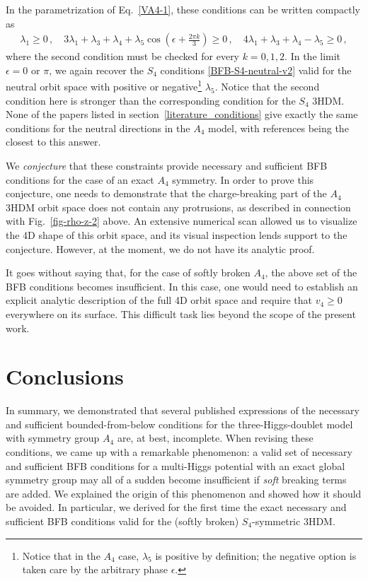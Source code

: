 \documentclass[11pt]{article}
\begin{document}
In the parametrization of Eq.~\eqref{VA4-1}, these conditions can be written compactly as 
\begin{eqnarray}
\lambda_1 \ge 0\,, \quad 
3\lambda_1 + \lambda_3 + \lambda_4 + \lambda_5 \cos\left(\epsilon + \frac{2\pi k}{3}\right) \ge 0\,,\quad 
4\lambda_1 + \lambda_3 + \lambda_4 - \lambda_5 \ge 0\,,
\label{BFB-A4-neural-v2}
\end{eqnarray}
where the second condition must be checked for every $k = 0,1,2$.
In the limit $\epsilon = 0$ or $\pi$, we again recover the $S_4$ conditions \eqref{BFB-S4-neutral-v2}
valid for the neutral orbit space with positive or negative\footnote{Notice that in the $A_4$ case,
$\lambda_5$ is positive by definition; the negative option is taken care by the arbitrary phase $\epsilon$.} $\lambda_5$. 
Notice that the second condition here is stronger than the corresponding condition for the $S_4$ 3HDM.
None of the papers listed in section~\ref{literature_conditions} give exactly the same conditions for the neutral
directions in the $A_4$ model, with references \cite{Dekens:2011,Pramanick:2017wry} being the closest to this answer.

We {\em conjecture} that these constraints provide necessary and sufficient BFB conditions for the case of an exact $A_4$ symmetry.
In order to prove this conjecture, one needs to demonstrate that the charge-breaking part of the $A_4$ 3HDM orbit space
does not contain any protrusions, as described in connection with Fig.~\ref{fig-rho-z-2} above. 
An extensive numerical scan allowed us to visualize the 4D shape of this orbit space,
and its visual inspection lends support to the conjecture. However, at the moment, we do not have its analytic proof.

It goes without saying that, for the case of softly broken $A_4$, the above set of the BFB conditions becomes insufficient.
In this case, one would need to establish an explicit analytic description of the full 4D orbit
space and require that $v_4 \ge 0$ everywhere on its surface. This difficult task lies beyond the scope of the present work.

\section{Conclusions}

In summary, we demonstrated that several published expressions of the necessary and sufficient bounded-from-below conditions 
for the three-Higgs-doublet model with symmetry group $A_4$ are, at best, incomplete.
When revising these conditions, we came up with a remarkable phenomenon:
a valid set of necessary and sufficient BFB conditions for a multi-Higgs potential with an exact global symmetry group
may all of a sudden become insufficient if {\em soft} breaking terms are added.
We explained the origin of this phenomenon and showed how it should be avoided.
In particular, we derived for the first time the exact necessary and sufficient BFB conditions
valid for the (softly broken) $S_4$-symmetric 3HDM.
\end{document}

